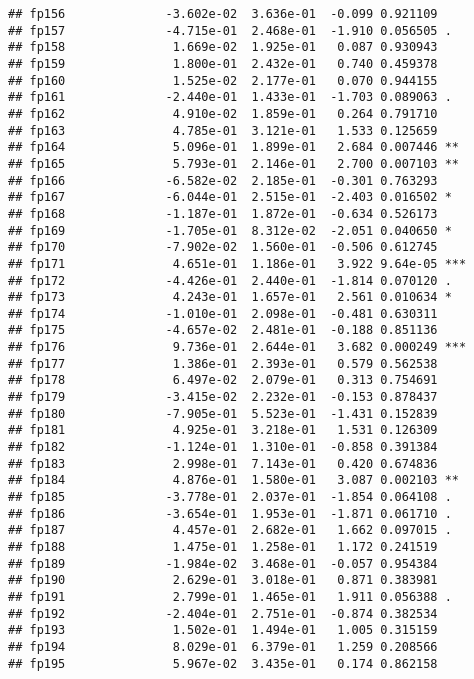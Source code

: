 \documentclass[]{article}
\begin{document}
\begin{verbatim}
## fp156              -3.602e-02  3.636e-01  -0.099 0.921109    
## fp157              -4.715e-01  2.468e-01  -1.910 0.056505 .  
## fp158               1.669e-02  1.925e-01   0.087 0.930943    
## fp159               1.800e-01  2.432e-01   0.740 0.459378    
## fp160               1.525e-02  2.177e-01   0.070 0.944155    
## fp161              -2.440e-01  1.433e-01  -1.703 0.089063 .  
## fp162               4.910e-02  1.859e-01   0.264 0.791710    
## fp163               4.785e-01  3.121e-01   1.533 0.125659    
## fp164               5.096e-01  1.899e-01   2.684 0.007446 ** 
## fp165               5.793e-01  2.146e-01   2.700 0.007103 ** 
## fp166              -6.582e-02  2.185e-01  -0.301 0.763293    
## fp167              -6.044e-01  2.515e-01  -2.403 0.016502 *  
## fp168              -1.187e-01  1.872e-01  -0.634 0.526173    
## fp169              -1.705e-01  8.312e-02  -2.051 0.040650 *  
## fp170              -7.902e-02  1.560e-01  -0.506 0.612745    
## fp171               4.651e-01  1.186e-01   3.922 9.64e-05 ***
## fp172              -4.426e-01  2.440e-01  -1.814 0.070120 .  
## fp173               4.243e-01  1.657e-01   2.561 0.010634 *  
## fp174              -1.010e-01  2.098e-01  -0.481 0.630311    
## fp175              -4.657e-02  2.481e-01  -0.188 0.851136    
## fp176               9.736e-01  2.644e-01   3.682 0.000249 ***
## fp177               1.386e-01  2.393e-01   0.579 0.562538    
## fp178               6.497e-02  2.079e-01   0.313 0.754691    
## fp179              -3.415e-02  2.232e-01  -0.153 0.878437    
## fp180              -7.905e-01  5.523e-01  -1.431 0.152839    
## fp181               4.925e-01  3.218e-01   1.531 0.126309    
## fp182              -1.124e-01  1.310e-01  -0.858 0.391384    
## fp183               2.998e-01  7.143e-01   0.420 0.674836    
## fp184               4.876e-01  1.580e-01   3.087 0.002103 ** 
## fp185              -3.778e-01  2.037e-01  -1.854 0.064108 .  
## fp186              -3.654e-01  1.953e-01  -1.871 0.061710 .  
## fp187               4.457e-01  2.682e-01   1.662 0.097015 .  
## fp188               1.475e-01  1.258e-01   1.172 0.241519    
## fp189              -1.984e-02  3.468e-01  -0.057 0.954384    
## fp190               2.629e-01  3.018e-01   0.871 0.383981    
## fp191               2.799e-01  1.465e-01   1.911 0.056388 .  
## fp192              -2.404e-01  2.751e-01  -0.874 0.382534    
## fp193               1.502e-01  1.494e-01   1.005 0.315159    
## fp194               8.029e-01  6.379e-01   1.259 0.208566    
## fp195               5.967e-02  3.435e-01   0.174 0.862158    

\end{verbatim}
\end{document}
